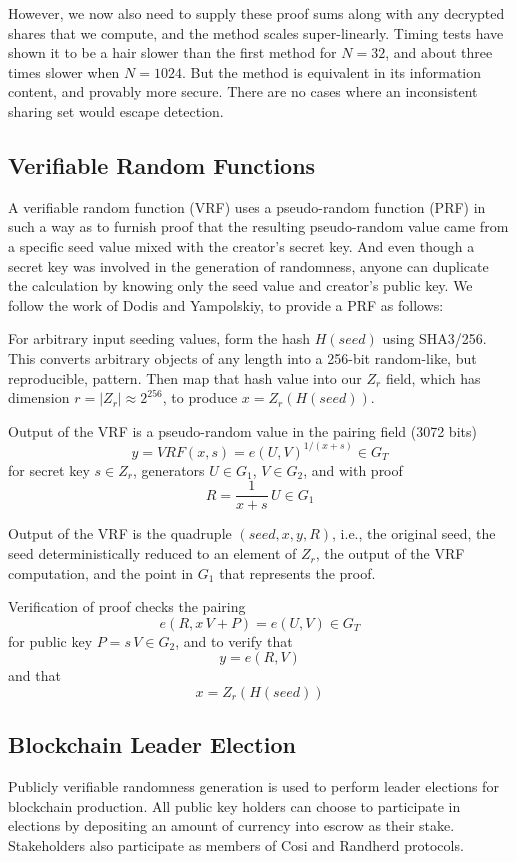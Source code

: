 \documentclass{yellowpaper}
\begin{document}
However, we now also need to supply these proof sums along with any decrypted shares that we compute, and the method scales super-linearly. Timing tests have shown it to be a hair slower than the first method for $N=32$, and about three times slower when $N=1024$. But the method is equivalent in its information content, and provably more secure. There are no cases where an inconsistent sharing set would escape detection.
\subsection{Verifiable Random Functions}
A verifiable random function (VRF)\cite{vrf2} uses a pseudo-random function (PRF) in such a way as to furnish proof that the resulting pseudo-random value came from a specific seed value mixed with the creator's secret key. And even though a secret key was involved in the generation of randomness, anyone can duplicate the calculation by knowing only the seed value and creator's public key. We follow the work of Dodis and Yampolskiy\cite{vrf}, to provide a PRF as follows:

For arbitrary input seeding values, form the hash $H(seed)$ using SHA3/256. This converts arbitrary objects of any length into a 256-bit random-like, but reproducible, pattern. Then map that hash value into our $Z_r$ field, which has dimension $r = |Z_r| \approx 2^{256}$, to produce $x = Z_r(H(seed))$.

Output of the VRF is a pseudo-random value in the pairing field (3072 bits) 
$$y = VRF(x, s) = e(U,V)^{1/(x + s)} \in G_T$$ 
for secret key $s \in Z_r$,  generators $U \in G_1$, $V \in G_2$, and with proof 
$$R = \frac{1}{x+s}\,U \in G_1$$ 

Output of the VRF is the quadruple $(seed, x, y, R)$, i.e., the original seed, the seed deterministically reduced to an element of $Z_r$, the output of the VRF computation, and the point in $G_1$ that represents the proof.

Verification of proof checks the pairing $$e(R, x \, V + P) = e(U,V)  \in G_T$$ for public key $P = s \, V \in G_2$, and to verify that $$y = e(R,V)$$ and that $$x = Z_r(H(seed))$$
\subsection{Blockchain Leader Election}
Publicly verifiable randomness generation is used to perform leader elections for blockchain production. All public key holders can choose to participate in elections by depositing an amount of currency into escrow as their stake. Stakeholders also participate as members of Cosi and Randherd protocols.
\end{document}
